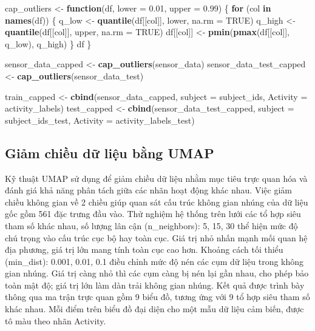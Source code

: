\documentclass[
]{article}
\newenvironment{Shaded}{\begin{snugshade}}{\end{snugshade}}
\newcommand{\AttributeTok}[1]{\textcolor[rgb]{0.13,0.29,0.53}{#1}}
\newcommand{\ConstantTok}[1]{\textcolor[rgb]{0.56,0.35,0.01}{#1}}
\newcommand{\ControlFlowTok}[1]{\textcolor[rgb]{0.13,0.29,0.53}{\textbf{#1}}}
\newcommand{\FloatTok}[1]{\textcolor[rgb]{0.00,0.00,0.81}{#1}}
\newcommand{\FunctionTok}[1]{\textcolor[rgb]{0.13,0.29,0.53}{\textbf{#1}}}
\newcommand{\NormalTok}[1]{#1}
\newcommand{\OtherTok}[1]{\textcolor[rgb]{0.56,0.35,0.01}{#1}}
\begin{document}
\begin{Shaded}
\begin{Highlighting}[]
\NormalTok{ cap\_outliers }\OtherTok{\textless{}{-}} \ControlFlowTok{function}\NormalTok{(df, }\AttributeTok{lower =} \FloatTok{0.01}\NormalTok{, }\AttributeTok{upper =} \FloatTok{0.99}\NormalTok{) \{}
   \ControlFlowTok{for}\NormalTok{ (col }\ControlFlowTok{in} \FunctionTok{names}\NormalTok{(df)) \{}
\NormalTok{     q\_low }\OtherTok{\textless{}{-}} \FunctionTok{quantile}\NormalTok{(df[[col]], lower, }\AttributeTok{na.rm =} \ConstantTok{TRUE}\NormalTok{)}
\NormalTok{     q\_high }\OtherTok{\textless{}{-}} \FunctionTok{quantile}\NormalTok{(df[[col]], upper, }\AttributeTok{na.rm =} \ConstantTok{TRUE}\NormalTok{)}
\NormalTok{     df[[col]] }\OtherTok{\textless{}{-}} \FunctionTok{pmin}\NormalTok{(}\FunctionTok{pmax}\NormalTok{(df[[col]], q\_low), q\_high)}
\NormalTok{   \}}
\NormalTok{   df}
\NormalTok{ \}}

\NormalTok{ sensor\_data\_capped }\OtherTok{\textless{}{-}} \FunctionTok{cap\_outliers}\NormalTok{(sensor\_data)}
\NormalTok{ sensor\_data\_test\_capped }\OtherTok{\textless{}{-}} \FunctionTok{cap\_outliers}\NormalTok{(sensor\_data\_test)}

\NormalTok{ train\_capped }\OtherTok{\textless{}{-}} \FunctionTok{cbind}\NormalTok{(sensor\_data\_capped, }\AttributeTok{subject =}\NormalTok{ subject\_ids, }\AttributeTok{Activity =}\NormalTok{ activity\_labels)}
\NormalTok{ test\_capped }\OtherTok{\textless{}{-}} \FunctionTok{cbind}\NormalTok{(sensor\_data\_test\_capped, }\AttributeTok{subject =}\NormalTok{ subject\_ids\_test, }\AttributeTok{Activity =}\NormalTok{ activity\_labels\_test)}
\end{Highlighting}
\end{Shaded}

\subsection{Giảm chiều dữ liệu bằng
UMAP}\label{giux1ea3m-chiux1ec1u-dux1eef-liux1ec7u-bux1eb1ng-umap}

Kỹ thuật UMAP sử dụng để giảm chiều dữ liệu nhằm mục tiêu trực quan hóa
và đánh giá khả năng phân tách giữa các nhãn hoạt động khác nhau. Việc
giảm chiều không gian về 2 chiều giúp quan sát cấu trúc không gian nhúng
của dữ liệu gốc gồm 561 đặc trưng đầu vào. Thử nghiệm hệ thống trên lưới
các tổ hợp siêu tham số khác nhau, số lượng lân cận (n\_neighbors): 5,
15, 30 thể hiện mức độ chú trọng vào cấu trúc cục bộ hay toàn cục. Giá
trị nhỏ nhấn mạnh mối quan hệ địa phương, giá trị lớn mang tính toàn cục
cao hơn. Khoảng cách tối thiểu (min\_dist): 0.001, 0.01, 0.1 điều chỉnh
mức độ nén các cụm dữ liệu trong không gian nhúng. Giá trị càng nhỏ thì
các cụm càng bị nén lại gần nhau, cho phép bảo toàn mật độ; giá trị lớn
làm dàn trải không gian nhúng. Kết quả được trình bày thông qua ma trận
trực quan gồm 9 biểu đồ, tương ứng với 9 tổ hợp siêu tham số khác nhau.
Mỗi điểm trên biểu đồ đại diện cho một mẫu dữ liệu cảm biến, được tô màu
theo nhãn Activity.
\end{document}
